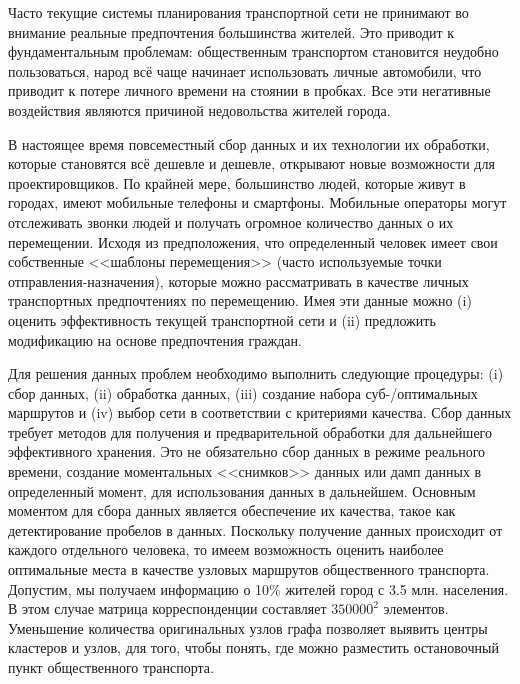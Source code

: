 Часто текущие системы планирования транспортной сети не принимают во внимание реальные предпочтения 
большинства жителей. Это приводит к фундаментальным проблемам: общественным транспортом становится неудобно 
пользоваться, народ всё чаще начинает использовать личные автомобили, что приводит к потере личного времени 
на стоянии в пробках. Все эти негативные воздействия являются причиной недовольства жителей города.

В настоящее время повсеместный сбор данных и их технологии их обработки, которые становятся всё дешевле и 
дешевле, открывают новые возможности для проектировщиков. По крайней мере, большинство людей, которые 
живут в городах, имеют мобильные телефоны и смартфоны. Мобильные операторы могут отслеживать звонки людей 
и получать огромное количество данных о их перемещении. Исходя из предположения, что определенный человек 
имеет свои собственные <<шаблоны перемещения>> (часто используемые точки отправления-назначения), которые 
можно рассматривать в качестве личных транспортных предпочтениях по перемещению. Имея эти данные можно (i) 
оценить эффективность текущей транспортной сети и (ii) предложить модификацию на основе предпочтения 
граждан.

Для решения данных проблем необходимо выполнить следующие процедуры: (i) сбор данных, (ii) обработка данных, 
(iii) создание набора суб-/оптимальных маршрутов и (iv) выбор сети в соответствии с критериями качества.
Сбор данных требует методов для получения и предварительной обработки для дальнейшего эффективного хранения.
Это не обязательно сбор данных в режиме реального времени, создание моментальных <<снимков>> данных или 
дамп данных в определенный момент, для использования данных в дальнейшем. Основным моментом для сбора 
данных является обеспечение их качества, такое как детектирование пробелов в данных. Поскольку получение 
данных происходит от каждого отдельного человека, то имеем возможность оценить наиболее оптимальные места в 
качестве узловых маршрутов общественного транспорта. Допустим, мы получаем информацию о 10\% жителей город 
с 3.5 млн. населения. В этом случае матрица корреспонденции составляет \( 350 000^2 \) элементов. Уменьшение 
количества оригинальных узлов графа позволяет выявить центры кластеров и узлов, для того, чтобы понять, где 
можно разместить остановочный пункт общественного транспорта.

